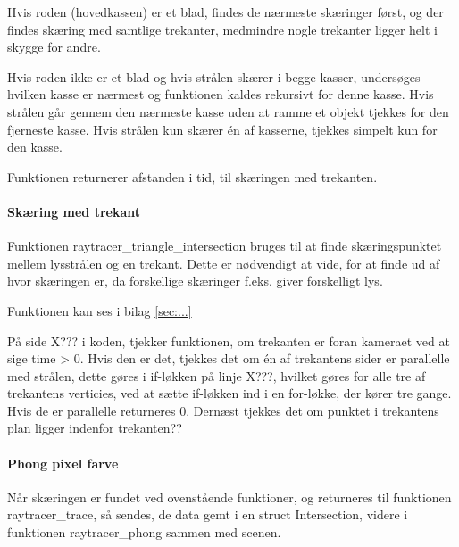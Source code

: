 Hvis roden (hovedkassen) er et blad, findes de nærmeste skæringer først, og der findes skæring med samtlige trekanter, medmindre nogle trekanter ligger helt i skygge for andre.

Hvis roden ikke er et blad og hvis strålen skærer i begge kasser, undersøges hvilken kasse er nærmest og funktionen kaldes rekursivt for denne kasse. Hvis strålen går gennem den nærmeste kasse uden at ramme et objekt tjekkes for den fjerneste kasse. Hvis strålen kun skærer én af kasserne, tjekkes simpelt kun for den kasse.

Funktionen returnerer afstanden i tid, til skæringen med trekanten.

\paragraph{Skæring med trekant}
Funktionen raytracer\_triangle\_intersection bruges til at finde skæringspunktet mellem lysstrålen og en trekant. Dette er nødvendigt at vide, for at finde ud af hvor skæringen er, da forskellige skæringer f.eks. giver forskelligt lys.

Funktionen kan ses i bilag \ref{sec:...}

På side X??? i koden, tjekker funktionen, om trekanten er foran kameraet ved at sige time > 0. Hvis den er det, tjekkes det om én af trekantens sider er parallelle med strålen, dette gøres i if-løkken på linje X???, hvilket gøres for alle tre af trekantens verticies, ved at sætte if-løkken ind i en for-løkke, der kører tre gange. Hvis de er parallelle returneres 0.
Dernæst tjekkes det om punktet i trekantens plan ligger indenfor trekanten??


\paragraph{Phong pixel farve}
Når skæringen er fundet ved ovenstående funktioner, og returneres til funktionen raytracer\_trace, så sendes, de data gemt i en struct Intersection, videre i funktionen raytracer\_phong sammen med scenen.


